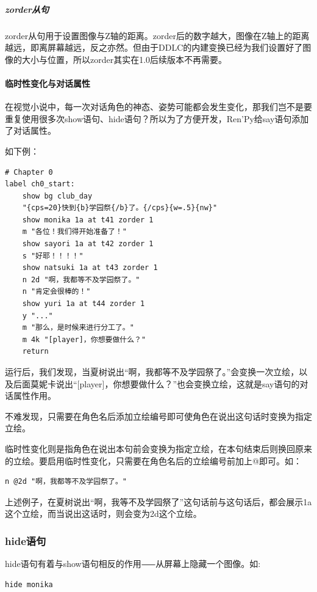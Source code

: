 \documentclass[../../Main.tex]{subfiles}
\begin{document}
\subparagraph{zorder从句}
zorder从句用于设置图像与Z轴的距离。zorder后的数字越大，图像在Z轴上的距离越远，即离屏幕越远，反之亦然。但由于DDLC的内建变换已经为我们设置好了图像的大小与位置，所以zorder其实在1.0后续版本不再需要。

\paragraph{临时性变化与对话属性}
在视觉小说中，每一次对话角色的神态、姿势可能都会发生变化，那我们岂不是要重复使用很多次show语句、hide语句？所以为了方便开发，Ren'Py给say语句添加了对话属性。

如下例：
\begin{lstlisting}
# Chapter 0
label ch0_start:
    show bg club_day
    "{cps=20}快到{b}学园祭{/b}了。{/cps}{w=.5}{nw}"
    show monika 1a at t41 zorder 1
    m "各位！我们得开始准备了！"
    show sayori 1a at t42 zorder 1
    s "好耶！！！！"
    show natsuki 1a at t43 zorder 1
    n 2d "啊，我都等不及学园祭了。"
    n "肯定会很棒的！"
    show yuri 1a at t44 zorder 1
    y "..."
    m "那么，是时候来进行分工了。"
    m 4k "[player]，你想要做什么？"
    return
\end{lstlisting}

运行后，我们发现，当夏树说出“啊，我都等不及学园祭了。”会变换一次立绘，以及后面莫妮卡说出“[player]，你想要做什么？”也会变换立绘，这就是say语句的对话属性作用。

不难发现，只需要在角色名后添加立绘编号即可使角色在说出这句话时变换为指定立绘。

临时性变化则是指角色在说出本句前会变换为指定立绘，在本句结束后则换回原来的立绘。要启用临时性变化，只需要在角色名后的立绘编号前加上@即可。如：
\begin{lstlisting}[numbers=none]
    n @2d "啊，我都等不及学园祭了。"
\end{lstlisting}

上述例子，在夏树说出“啊，我等不及学园祭了”这句话前与这句话后，都会展示1a这个立绘，而当说出这话时，则会变为2d这个立绘。

\subsubsection{hide语句}

hide语句有着与show语句相反的作用⸺从屏幕上隐藏一个图像。如:

\begin{lstlisting}[numbers=none]
hide monika
\end{lstlisting}
\end{document}
